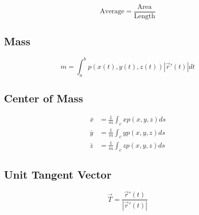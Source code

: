     \begin{equation}
      \text{Average} = \frac{\text{Area}}{\text{Length}}
    \end{equation}

  \subsection{Mass}

    \begin{equation}
      m = \int_{a}^{b} p
      \left(
        x\left( t \right),
        y\left( t \right),
        z\left( t \right)
      \right) \left| \vec{r}'(t) \right| dt
    \end{equation}

  \subsection{Center of Mass}

    \begin{align}
      \overline{x} &= \frac{1}{m} \int_{c} x p\left( x, y, z \right) ds \\
      \overline{y} &= \frac{1}{m} \int_{c} y p\left( x, y, z \right) ds \\
      \overline{z} &= \frac{1}{m} \int_{c} z p\left( x, y, z \right) ds
    \end{align}

  \subsection{Unit Tangent Vector}

    \begin{equation}
      \vec{T} = \frac{\vec{r}'\left( t \right)}{\left| \vec{r}'\left( t \right) \right|}
    \end{equation}